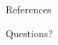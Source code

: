 \documentclass[10pt, aspectratio=43]{beamer}
\newcommand{\0}{\mathbf{0}}
\newcommand{\1}{\mathbf{1}}
\newcommand{\2}{\mathbf{2}}
\begin{document}
\begin{frame}{References}
    \printbibliography

    \nocite{*}
\end{frame}

\begin{frame}
    \begin{center}
        \Huge{Questions?}
    \end{center}
\end{frame}
\end{document}
